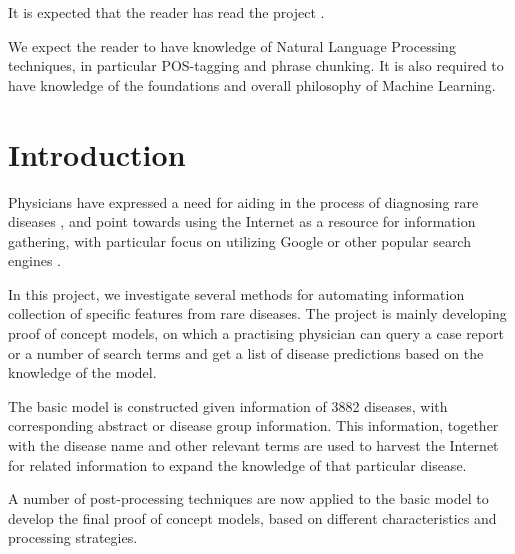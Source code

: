 \documentclass[10pt,letterpaper,final]{article}
\begin{document}
It is expected that the reader has read the project
\cite{jensenandersen}.

We expect the reader to have knowledge of Natural Language Processing
techniques, in particular POS-tagging and phrase chunking. It is also
required to have knowledge of the foundations and overall philosophy of
Machine Learning.


\section{Introduction}
Physicians have expressed a need for aiding in the process of diagnosing
rare diseases \cite{googlingdiagnosis}, and point towards using the
Internet as a resource for information gathering, with particular focus
on utilizing Google or other popular search engines
\cite{googlechangemedicine} \cite{diagnosissearchengines}.


In this project, we investigate several methods for automating
information collection of specific features from rare diseases. The
project is mainly developing proof of concept models, on which a
practising physician can query a case report or a number of search terms
and get a list of disease predictions based on the knowledge of the
model.

The basic model is constructed given information of 3882 diseases, with
corresponding abstract or disease group information. This information,
together with the disease name and other relevant terms are used to
harvest the Internet for related information to expand the knowledge of
that particular disease.

A number of post-processing techniques are now applied to the basic
model to develop the final proof of concept models, based on different
characteristics and processing strategies.


\end{document}
